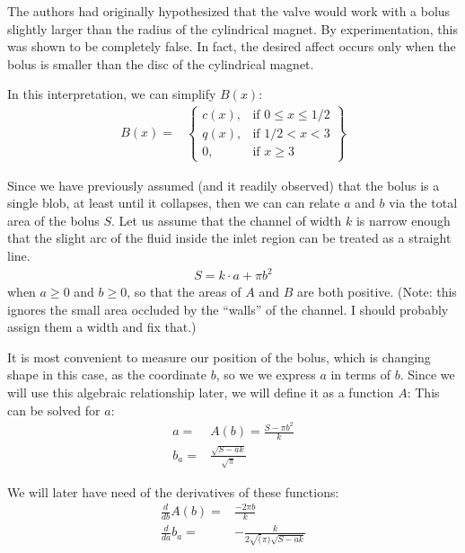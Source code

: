\documentclass{asme2ej}
\begin{document}
The authors had originally hypothesized that the valve would work with a bolus
slightly larger than the radius of the cylindrical magnet.
By experimentation, this was shown to be completely false.
In fact, the desired affect occurs only when the bolus is smaller than the
disc of the cylindrical magnet.

In this interpretation, we can simplify $B(x)$:
\begin{align}
B(x) = &
\left\{
    \begin{array}{lr}
      c(x) , & \text{if } 0 \leq x \leq 1/2 \\
      q(x) , & \text{if } 1/2 < x < 3 \\
      0 , & \text{if } x \geq 3
    \end{array}
    \right\}
    \label{eq:Bfield}
\end{align}


Since we have previously assumed (and it readily observed) that the bolus is a single blob,
at least until it collapses, then we can can relate $a$ and $b$
via the total area of the bolus $S$.
Let us assume that the channel of width $k$ is narrow enough
that the slight arc of the fluid inside the inlet region can be treated as a
straight line.
\begin{align}
S = k \cdot a + \pi b^2
\end{align}
when $a \geq 0$ and $b \geq 0$, so that the areas of $A$ and $B$ are both positive.
(Note: this ignores the small area occluded by the ``walls'' of the channel.
I should probably assign them a width and fix that.)

It is most convenient to measure our position of the bolus, which is
changing shape in this case, as the coordinate $b$, so we we express
$a$ in terms of $b$. Since we will use this algebraic relationship later, we will define it as a function $A$:
This can be solved for $a$:
\begin{align}
  a = & A(b) = \frac{S - \pi b^2}{k} \\
  b_a = & \frac{\sqrt{S - ak}}{\sqrt{\pi}}
  \label{eqn:afromS}
\end{align}

We will later have need of the derivatives of these functions:
\begin{align}
  \frac{d}{db} A(b) = & \frac{- 2\pi b}{k} \\
  \frac{d}{da} b_a = &  -\frac{k}{2 \sqrt(\pi) \sqrt{S - a k}}
  \label{eqn:afromS}
\end{align}
\end{document}
